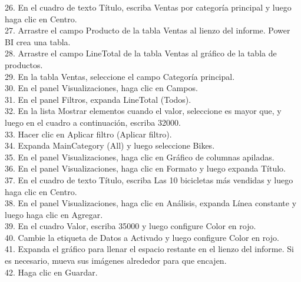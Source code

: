 \documentclass[12pt,letterpaper]{article}
\begin{document}
\begin{flushleft}
\begin{itemize}
26. En el cuadro de texto Título, escriba Ventas por categoría principal y luego haga clic en Centro.\\
27. Arrastre el campo Producto de la tabla Ventas al lienzo del informe. Power BI crea una tabla.\\
28. Arrastre el campo LineTotal de la tabla Ventas al gráfico de la tabla de productos.\\
29. En la tabla Ventas, seleccione el campo Categoría principal.\\
30. En el panel Visualizaciones, haga clic en Campos.\\
31. En el panel Filtros, expanda LineTotal (Todos).\\
32. En la lista Mostrar elementos cuando el valor, seleccione es mayor que, y luego en el cuadro a continuación, escriba 32000.\\
33. Hacer clic en Aplicar filtro (Aplicar filtro).\\
34. Expanda MainCategory (All) y luego seleccione Bikes.\\
35. En el panel Visualizaciones, haga clic en Gráfico de columnas apiladas.\\
36. En el panel Visualizaciones, haga clic en Formato y luego expanda Título.\\
37. En el cuadro de texto Título, escriba Las 10 bicicletas más vendidas y luego haga clic en Centro.\\
38. En el panel Visualizaciones, haga clic en Análisis, expanda Línea constante y luego haga clic en Agregar.\\
39. En el cuadro Valor, escriba 35000 y luego configure Color en rojo.\\
40. Cambie la etiqueta de Datos a Activado y luego configure Color en rojo.\\
41. Expanda el gráfico para llenar el espacio restante en el lienzo del informe. Si es necesario, mueva sus imágenes
alrededor para que encajen.\\
42. Haga clic en Guardar.\\


\end{itemize}
\end{flushleft}
\end{document}
